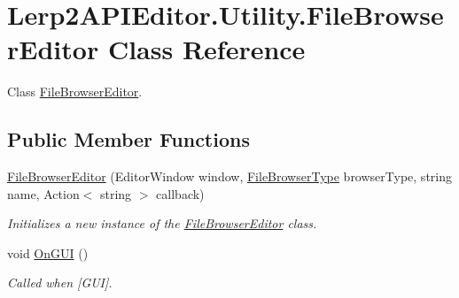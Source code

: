 \hypertarget{class_lerp2_a_p_i_editor_1_1_utility_1_1_file_browser_editor}{}\section{Lerp2\+A\+P\+I\+Editor.\+Utility.\+File\+Browser\+Editor Class Reference}
\label{class_lerp2_a_p_i_editor_1_1_utility_1_1_file_browser_editor}


Class \hyperlink{class_lerp2_a_p_i_editor_1_1_utility_1_1_file_browser_editor}{File\+Browser\+Editor}.  


\subsection*{Public Member Functions}
\begin{DoxyCompactItemize}
\item 
\hyperlink{class_lerp2_a_p_i_editor_1_1_utility_1_1_file_browser_editor_a8d802048645ebf379b98bed7cf7537df}{File\+Browser\+Editor} (Editor\+Window window, \hyperlink{namespace_lerp2_a_p_i_1_1_utility_af5d628470963cc0f18c37055b4170bf1}{File\+Browser\+Type} browser\+Type, string name, Action$<$ string $>$ callback)
\begin{DoxyCompactList}\small\item\em Initializes a new instance of the \hyperlink{class_lerp2_a_p_i_editor_1_1_utility_1_1_file_browser_editor}{File\+Browser\+Editor} class. \end{DoxyCompactList}\item 
void \hyperlink{class_lerp2_a_p_i_editor_1_1_utility_1_1_file_browser_editor_a080b0cafd53b5aa1139d2819ac9647e3}{On\+G\+UI} ()
\begin{DoxyCompactList}\small\item\em Called when \mbox{[}G\+UI\mbox{]}. \end{DoxyCompactList}\end{DoxyCompactItemize}
